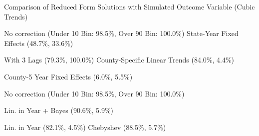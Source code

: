 \caption{Comparison of Reduced Form Solutions with Simulated Outcome Variable (Cubic Trends) \label{fig:distributions-existing-solutions}}
\caption*{\color{p1line}{\textbf{\textemdash\textemdash}} No correction (Under 10 Bin: 98.5\%, Over 90 Bin: 100.0\%) \hspace{1cm} \color{p2line}{- - -} State-Year Fixed Effects (48.7\%, 33.6\%)}
\caption*{\color{p3line}{\textbf{- - -}} With 3 Lags (79.3\%, 100.0\%) \hspace{1cm} \color{p4line}{\textbf{- - -}} County-Specific Linear Trends (84.0\%, 4.4\%)}
\caption*{\color{p5line}{\textbf{- - -}} County-5 Year Fixed Effects (6.0\%, 5.5\%)}


\caption*{\color{p1line}{\textbf{\textemdash\textemdash}} No correction (Under 10 Bin: 98.5\%, Over 90 Bin: 100.0\%)}
\caption*{\color{p2line}{\textbf{- - -}} Lin. in Year + Bayes (90.6\%, 5.9\%)}
\caption*{\color{p3line}{\textbf{- - -}} Lin. in Year (82.1\%, 4.5\%) \hspace{1cm} \color{p4line}{\textbf{- - -}} Chebyshev (88.5\%, 5.7\%)}